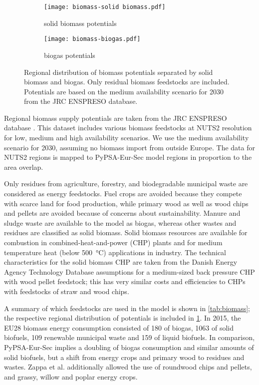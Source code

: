 \begin{figure}
    \centering
    \begin{subfigure}[t]{0.49\textwidth}
        \centering
        \caption{solid biomass potentials}
        \texttt{[image: biomass-solid biomass.pdf]}
    \end{subfigure}
    \begin{subfigure}[t]{0.49\textwidth}
        \centering
        \caption{biogas potentials}
        \texttt{[image: biomass-biogas.pdf]}
    \end{subfigure}
    \caption{Regional distribution of biomass potentials separated by solid biomass and biogas. Only residual biomass feedstocks are included. Potentials are based on the medium availability scenario for 2030 from the JRC ENSPRESO database.}
    \label{fig:biomass-potentials}
\end{figure}

Regional biomass supply potentials are taken from the JRC ENSPRESO database
. This dataset includes various biomass feedstocks at
NUTS2 resolution for low, medium and high availability scenarios.  We use the
medium availability scenario for 2030, assuming no biomass import from outside
Europe. The data for NUTS2 regions is mapped to PyPSA-Eur-Sec model regions in
proportion to the area overlap.

Only residues from agriculture, forestry, and biodegradable municipal
waste are considered as energy feedstocks. Fuel crops are avoided because they
compete with scarce land for food production, while primary wood as well as wood
chips and pellets are avoided because of concerns about sustainability.
Manure and sludge waste are available to the model as biogas, whereas other
wastes and residues are classified as solid biomass. Solid biomass resources are
available for combustion in combined-heat-and-power (CHP) plants and for medium
temperature heat (below \SI{500}{\celsius}) applications in industry.
The technical characteristics for the solid biomass CHP are taken from the
Danish Energy Agency Technology Database assumptions for a
medium-sized back pressure CHP with wood pellet feedstock; this has very similar
costs and efficiencies to CHPs with feedstocks of straw and wood chips.

A summary of which feedstocks are used in the model is shown in
\cref{tab:biomass}; the respective regional distribution of potentials is
included in \cref{fig:biomass-potentials}. In 2015, the EU28 biomass energy
consumption consisted of \SI{180}{\twh} of biogas, \SI{1063}{\twh} of solid
biofuels, \SI{109}{\twh} renewable municipal waste and \SI{159}{\twh} of liquid
biofuels. In comparison, PyPSA-Eur-Sec implies a doubling of biogas
consumption and similar amounts of solid biofuels, but a shift from energy crops
and primary wood to residues and wastes. Zappa et al.
 additionally allowed the use of roundwood chips
and pellets, and grassy, willow and poplar energy crops.

